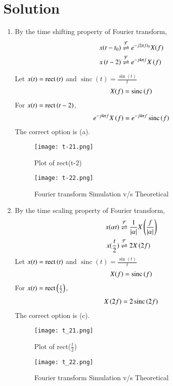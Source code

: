 \documentclass[journal,12pt,twocolumn]{IEEEtran}
\DeclareMathOperator{\sinc}{sinc}
\DeclareMathOperator{\rect}{rect}
\begin{document}
\section*{Solution}
\begin{enumerate}
    
\item By the time shifting property of Fourier transform,
\begin{align}
    x(t - t_0)&\overset{\mathcal{F}}{ \rightleftharpoons}{e^{-j2\pi ft_0}X(f)}\\
    x\left({t-2}\right)&\overset{\mathcal{F}}{ \rightleftharpoons} {e^{-{j4\pi f}}X\left(f\right)}
\end{align}


Let $x(t) = \rect{\brak{t}}$ and $\sinc(t) = \frac{\sin(t)}{t}$
\begin{align}
    X(f) = \sinc\brak{f}
\end{align}
For $x(t) = \rect{\brak{t-2}}$,
\begin{align}
    e^{-{j4\pi f}}X\brak{f} = e^{-{j4\pi f}}\sinc\brak{{f}}
\end{align}
The correct option is (a).
\begin{figure}
    \centering
    \texttt{[image: t-21.png]}
    \caption{Plot of rect(t-2)}
    \label{fig:my_label}
\end{figure}
\begin{figure}
    \centering
    \texttt{[image: t-22.png]}
    \caption{Fourier transform Simulation v/s Theoretical}
    \label{fig:my_label1}
\end{figure}
\item By the time scaling property of Fourier transform,
\begin{align}
    x(\alpha t)&\overset{\mathcal{F}}{ \rightleftharpoons}{\frac{1}{|\alpha|}}X\left(\frac{f}{|\alpha|}\right)\\
    x(\frac{t}{2})&\overset{\mathcal{F}}{ \rightleftharpoons}2X\left(2f\right)
\end{align}
Let $x(t) = \rect{\brak{t}}$ and $\sinc(t) = \frac{\sin(t)}{t}$
\begin{align}
    X(f) = \sinc\brak{f}
\end{align}
For $x(t) = \rect{\brak{\frac{t}{2}}}$,
\begin{align}
    {2}X\brak{{2f}} = {2}\sinc\brak{{2f}}
\end{align}
The correct option is (c).
\begin{figure}
    \centering
    \texttt{[image: t\_21.png]}
    \caption{Plot of rect($\frac{t}{2}$)}
    \label{fig:my_label2}
\end{figure}
\begin{figure}
    \centering
    \texttt{[image: t\_22.png]}
    \caption{Fourier transform Simulation v/s Theoretical}
    \label{fig:my_label3}
\end{figure}
\end{enumerate}
\end{document}
